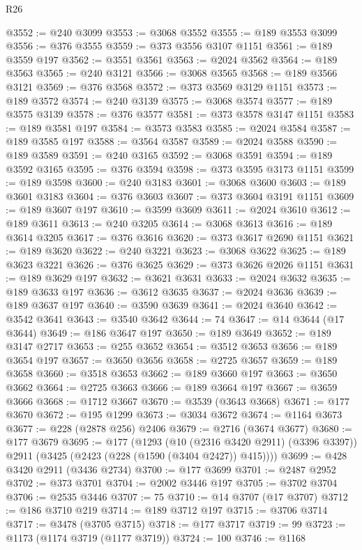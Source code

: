 \begin{lexlean}{R26}
\begin{coremodule}
@3552 := @240 @3099
@3553 := @3068 @3552
@3555 := @189 @3553 @3099
@3556 := @376 @3555
@3559 := @373 @3556 @3107 @1151
@3561 := @189 @3559 @197
@3562 := @3551 @3561
@3563 := @2024 @3562
@3564 := @189 @3563
@3565 := @240 @3121
@3566 := @3068 @3565
@3568 := @189 @3566 @3121
@3569 := @376 @3568
@3572 := @373 @3569 @3129 @1151
@3573 := @189 @3572
@3574 := @240 @3139
@3575 := @3068 @3574
@3577 := @189 @3575 @3139
@3578 := @376 @3577
@3581 := @373 @3578 @3147 @1151
@3583 := @189 @3581 @197
@3584 := @3573 @3583
@3585 := @2024 @3584
@3587 := @189 @3585 @197
@3588 := @3564 @3587
@3589 := @2024 @3588
@3590 := @189 @3589
@3591 := @240 @3165
@3592 := @3068 @3591
@3594 := @189 @3592 @3165
@3595 := @376 @3594
@3598 := @373 @3595 @3173 @1151
@3599 := @189 @3598
@3600 := @240 @3183
@3601 := @3068 @3600
@3603 := @189 @3601 @3183
@3604 := @376 @3603
@3607 := @373 @3604 @3191 @1151
@3609 := @189 @3607 @197
@3610 := @3599 @3609
@3611 := @2024 @3610
@3612 := @189 @3611
@3613 := @240 @3205
@3614 := @3068 @3613
@3616 := @189 @3614 @3205
@3617 := @376 @3616
@3620 := @373 @3617 @2690 @1151
@3621 := @189 @3620
@3622 := @240 @3221
@3623 := @3068 @3622
@3625 := @189 @3623 @3221
@3626 := @376 @3625
@3629 := @373 @3626 @2026 @1151
@3631 := @189 @3629 @197
@3632 := @3621 @3631
@3633 := @2024 @3632
@3635 := @189 @3633 @197
@3636 := @3612 @3635
@3637 := @2024 @3636
@3639 := @189 @3637 @197
@3640 := @3590 @3639
@3641 := @2024 @3640
@3642 := @3542 @3641
@3643 := @3540 @3642
@3644 := 74
@3647 := @14 @3644 (@17 @3644)
@3649 := @186 @3647 @197
@3650 := @189 @3649
@3652 := @189 @3147 @2717
@3653 := @255 @3652
@3654 := @3512 @3653
@3656 := @189 @3654 @197
@3657 := @3650 @3656
@3658 := @2725 @3657
@3659 := @189 @3658
@3660 := @3518 @3653
@3662 := @189 @3660 @197
@3663 := @3650 @3662
@3664 := @2725 @3663
@3666 := @189 @3664 @197
@3667 := @3659 @3666
@3668 := @1712 @3667
@3670 := @3539 (@3643 @3668)
@3671 := @177 @3670
@3672 := @195 @1299
@3673 := @3034 @3672
@3674 := @1164 @3673
@3677 := @228 (@2878 @256) @2406
@3679 := @2716 (@3674 @3677)
@3680 := @177 @3679
@3695 := @177
    (@1293
      (@10 (@2316 @3420 @2911) (@3396 @3397))
      @2911
      (@3425 (@2423 (@228 (@1590 (@3404 @2427)) @415))))
@3699 := @428 @3420 @2911 (@3436 @2734)
@3700 := @177 @3699
@3701 := @2487 @2952
@3702 := @373 @3701
@3704 := @2002 @3446 @197
@3705 := @3702 @3704
@3706 := @2535 @3446
@3707 := 75
@3710 := @14 @3707 (@17 @3707)
@3712 := @186 @3710 @219
@3714 := @189 @3712 @197
@3715 := @3706 @3714
@3717 := @3478 (@3705 @3715)
@3718 := @177 @3717
@3719 := 99
@3723 := @1173 (@1174 @3719 (@1177 @3719))
@3724 := 100
@3746 := @1168

\end{coremodule}
\end{lexlean}
